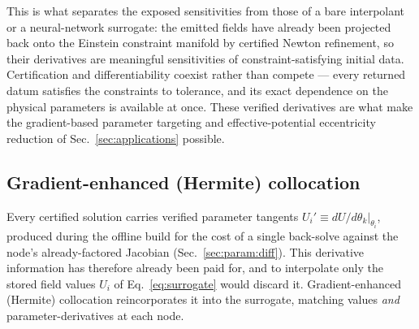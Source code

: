 \documentclass[
  aps,
  prd,
  twocolumn,
  amsmath,
  amssymb,
  nofootinbib,
  superscriptaddress,
  floatfix,
]{revtex4-2}
\begin{document}
This is what separates the exposed sensitivities from those of a bare interpolant or
a neural-network surrogate: the emitted fields have already been projected back onto
the Einstein constraint manifold by certified Newton refinement, so their derivatives
are meaningful sensitivities of constraint-satisfying initial data. Certification and
differentiability coexist rather than compete --- every returned datum satisfies the
constraints to tolerance, and its exact dependence on the physical parameters is
available at once. These verified derivatives are what make the gradient-based
parameter targeting and effective-potential eccentricity reduction of
Sec.~\ref{sec:applications} possible.

\subsection{Gradient-enhanced (Hermite) collocation}
\label{sec:param:hermite}
Every certified solution carries verified parameter tangents
$U_i'\equiv dU/d\theta_k|_{\theta_i}$, produced during the offline build for the cost
of a single back-solve against the node's already-factored Jacobian
(Sec.~\ref{sec:param:diff}). This derivative information has therefore already been
paid for, and to interpolate only the stored field values $U_i$ of
Eq.~\eqref{eq:surrogate} would discard it. Gradient-enhanced (Hermite) collocation
reincorporates it into the surrogate, matching values \emph{and}
parameter-derivatives at each node.
\end{document}
